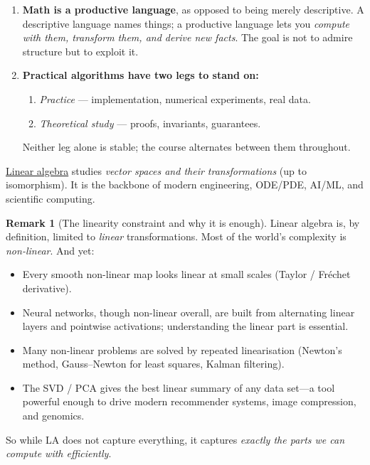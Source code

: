 \documentclass[11pt]{article}
\theoremstyle{definition}
\newtheorem{remark}{Remark}[section]
\theoremstyle{plain}
\begin{document}
\begin{enumerate}
  \item \textbf{Math is a productive language}, as opposed to being merely
    descriptive.  A descriptive language names things; a productive language
    lets you \emph{compute with them, transform them, and derive new facts}.
    The goal is not to admire structure but to exploit it.

  \item \textbf{Practical algorithms have two legs to stand on:}
    \begin{enumerate}[label=\arabic*.]
      \item \emph{Practice} --- implementation, numerical experiments,
            real data.
      \item \emph{Theoretical study} --- proofs, invariants, guarantees.
    \end{enumerate}
    Neither leg alone is stable; the course alternates between them
    throughout.
\end{enumerate}

\medskip\noindent
\underline{Linear algebra} studies \emph{vector spaces and their
transformations} (up to isomorphism).  It is the backbone of modern
engineering, ODE/PDE, AI/ML, and scientific computing.

\begin{remark}[The linearity constraint and why it is enough]
  Linear algebra is, by definition, limited to \emph{linear} transformations.
  Most of the world's complexity is \emph{non-linear}.  And yet:
  \begin{itemize}
    \item Every smooth non-linear map looks linear at small scales
          (Taylor / Fr\'echet derivative).
    \item Neural networks, though non-linear overall, are built from
          alternating linear layers and pointwise activations; understanding
          the linear part is essential.
    \item Many non-linear problems are solved by repeated linearisation
          (Newton's method, Gauss--Newton for least squares, Kalman filtering).
    \item The SVD / PCA gives the best linear summary of any data set---a
          tool powerful enough to drive modern recommender systems, image
          compression, and genomics.
  \end{itemize}
  So while LA does not capture everything, it captures \emph{exactly the
  parts we can compute with efficiently}.
\end{remark}
\end{document}
